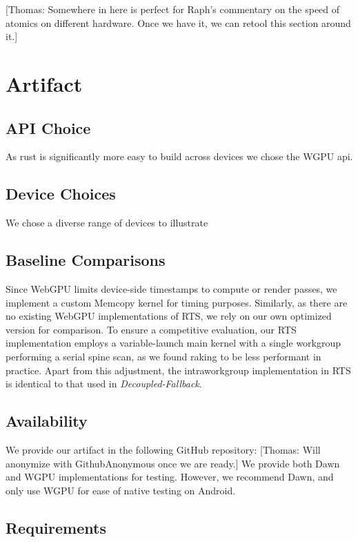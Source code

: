 \documentclass[sigconf]{acmart}
\newcommand{\thomas}[1]{{\footnotesize\color{orange}[Thomas: #1]}}
\begin{document}
\thomas{Somewhere in here is perfect for Raph's commentary on the speed of atomics on different hardware. Once we have it, we can retool this section around it.}

\begin{acks}
\end{acks}




\clearpage
\appendix
\section{Artifact}

\subsection{API Choice}
As rust is significantly more easy to build across devices we chose the WGPU api.

\subsection{Device Choices}
We chose a diverse range of devices to illustrate

\subsection{Baseline Comparisons}
Since WebGPU limits device-side timestamps to compute or render passes, we implement a custom Memcopy kernel for timing purposes. Similarly, as there are no existing WebGPU implementations of RTS, we rely on our own optimized version for comparison. To ensure a competitive evaluation, our RTS implementation employs a variable-launch main kernel with a single workgroup performing a serial spine scan, as we found raking to be less performant in practice. Apart from this adjustment, the intraworkgroup implementation in RTS is identical to that used in \emph{Decoupled-Fallback}.

\subsection{Availability}
We provide our artifact in the following GitHub repository: 
\thomas{Will anonymize with GithubAnonymous once we are ready.} 
We provide both Dawn and WGPU implementations for testing. However, we recommend Dawn, and only use WGPU for ease of native testing on Android.

\subsection{Requirements}
\end{document}
